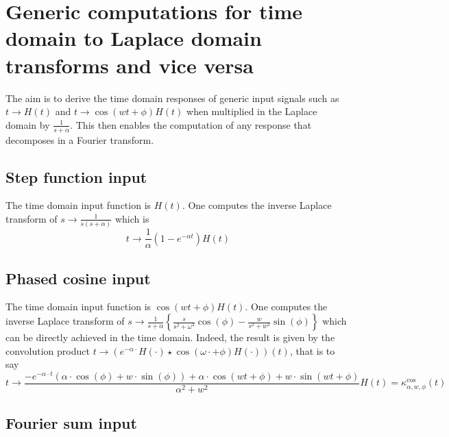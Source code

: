 \documentclass[preprint]{elsarticle}
\begin{document}
\newpage
\appendix
\section{Generic computations for time domain to Laplace domain transforms
and vice versa\label{sub:Generic-computations}}

The aim is to derive the time domain responses of generic input signals
such as $t\rightarrow H\left(t\right)$ and $t\rightarrow \cos\left(wt+\phi\right)H\left(t\right)$
when multiplied in the Laplace domain by $\frac{1}{s+\alpha}$. This
then enables the computation of any response that decomposes in a
Fourier transform.


\subsection{Step function input}

The time domain input function is $H\left(t\right)$. One computes
the inverse Laplace transform of $s\rightarrow\frac{1}{s\left(s+\alpha\right)}$
which is 
\[
t\rightarrow\frac{1}{\alpha}\left(1-e^{-\alpha t}\right)H\left(t\right)
\]



\subsection{Phased cosine input}

The time domain input function is $\cos\left(wt+\phi\right)H\left(t\right)$.
One computes the inverse Laplace transform of $s\rightarrow\frac{1}{s+\alpha}\left\{ \frac{s}{s^{2}+\omega^{2}}\cos\left(\phi\right)-\frac{w}{s^{2}+w^{2}}\sin\left(\phi\right)\right\} $
which can be directly achieved in the time domain. Indeed, the result
is given by the convolution product $t\rightarrow\left(e^{-\alpha\cdot}H\left(\cdot\right)\star \cos\left(\omega\cdot+\phi\right)H\left(\cdot\right)\right)\left(t\right)$,
that is to say 
\[
t\rightarrow\frac{-e^{-\alpha\cdot t}\left(\alpha\cdot \cos\left(\phi\right)+w\cdot \sin\left(\phi\right)\right)+\alpha\cdot \cos\left(wt+\phi\right)+w\cdot \sin\left(wt+\phi\right)}{\alpha^{2}+w^{2}}H\left(t\right)=\kappa_{\alpha,w,\phi}^{\text{cos}}\left(t\right)
\]



\subsection{Fourier sum input}
\end{document}
